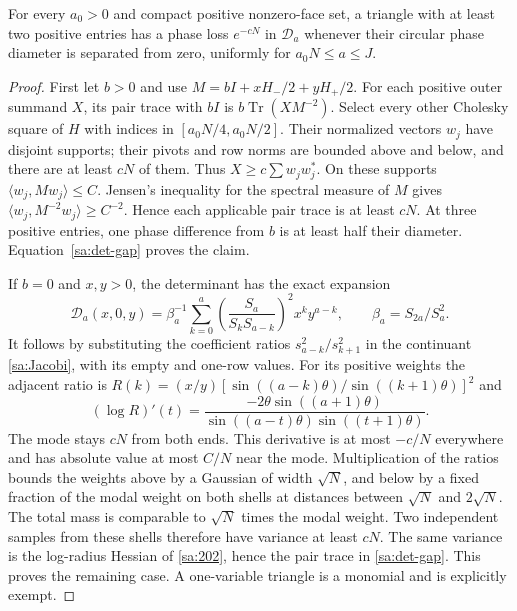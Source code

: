 \begin{lemma}\label{sa:triangle-gap}
For every $a_0>0$ and compact positive nonzero-face set, a triangle
with at least two positive entries has a phase loss $e^{-cN}$ in
$\mathcal D_a$ whenever their circular phase diameter is separated
from zero, uniformly for $a_0N\le a\le J$.
\end{lemma}
\begin{proof}
First let $b>0$ and use $M=bI+xH_-/2+yH_+/2$. For each positive
outer summand $X$, its pair trace with $bI$ is
$b\operatorname{Tr}(XM^{-2})$. Select every other Cholesky square
of $H$ with indices in $[a_0N/4,a_0N/2]$. Their normalized vectors
$w_j$ have disjoint supports; their pivots and row norms are bounded
above and below, and there are at least $cN$ of them. Thus
$X\ge c\sum w_jw_j^*$. On these supports
$\langle w_j,Mw_j\rangle\le C$. Jensen's inequality for the spectral
measure of $M$ gives
$\langle w_j,M^{-2}w_j\rangle\ge C^{-2}$.
Hence each applicable pair trace is at least $cN$.
At three positive entries, one phase difference from $b$ is at
least half their diameter. Equation~\eqref{sa:det-gap} proves the claim.

If $b=0$ and $x,y>0$, the determinant has the exact expansion
\begin{equation}\label{sa:202}
 \mathcal D_a(x,0,y)=\beta_a^{-1}
       \sum_{k=0}^a\left(\frac{S_a}{S_kS_{a-k}}\right)^2x^ky^{a-k},
                   \qquad\beta_a=S_{2a}/S_a^2.
\end{equation}
It follows by substituting the coefficient ratios
$s_{a-k}^2/s_{k+1}^2$ in the continuant
\eqref{sa:Jacobi}, with its empty and one-row values.
For its positive weights the adjacent ratio is
$R(k)=(x/y)[\sin((a-k)\theta)/\sin((k+1)\theta)]^2$ and
\[
 (\log R)'(t)=
 \frac{-2\theta\sin((a+1)\theta)}
        {\sin((a-t)\theta)\sin((t+1)\theta)}.
\]
The mode stays $cN$ from both ends. This derivative is at most
$-c/N$ everywhere and has absolute value at most $C/N$ near the mode.
Multiplication of the ratios bounds the weights above by a Gaussian
of width $\sqrt N$, and below by a fixed fraction of the modal weight
on both shells at distances between $\sqrt N$ and $2\sqrt N$.
The total mass is comparable to $\sqrt N$ times the modal weight.
Two independent samples from these shells therefore have variance
at least $cN$. The same variance is the log-radius Hessian of
\eqref{sa:202}, hence the pair trace in \eqref{sa:det-gap}.
This proves the remaining case. A one-variable triangle is a monomial
and is explicitly exempt.
\end{proof}

